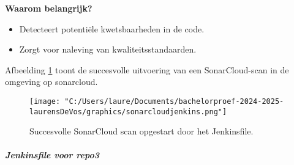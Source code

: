 \textbf{Waarom belangrijk?}
\begin{itemize}
    \item Detecteert potentiële kwetsbaarheden in de code.
    \item Zorgt voor naleving van kwaliteitsstandaarden.
\end{itemize}

Afbeelding \ref{fig:sonarcloud_scan} toont de succesvolle uitvoering van een SonarCloud-scan in de omgeving op sonarcloud.

\begin{figure}[h!]
    \centering
    \texttt{[image: "C:/Users/laure/Documents/bachelorproef-2024-2025-laurensDeVos/graphics/sonarcloudjenkins.png"]}
    \caption{Succesvolle SonarCloud scan opgestart door het Jenkinsfile.}
    \label{fig:sonarcloud_scan}
\end{figure}

\subparagraph{Jenkinsfile voor repo3} 

